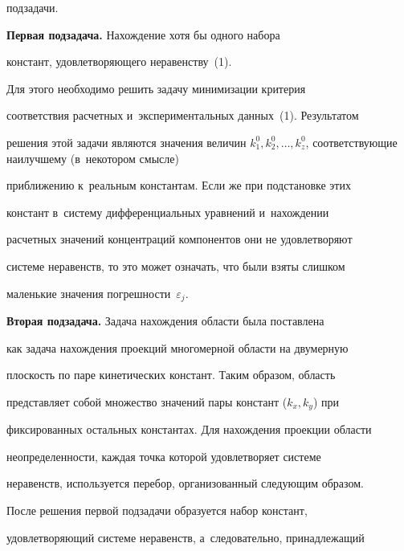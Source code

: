 под\-за\-дачи.

{



}



\smallskip

  

  \textbf{Первая подзадача.} Нахождение хотя бы одного набора 

констант, удовлетворяющего неравенству~(1). 

  

  Для этого необходимо решить задачу минимизации критерия 

соответствия расчетных и~экспериментальных данных~(1). Результатом 

решения этой задачи являются значения величин $k_1^0, k_2^0,\ldots , 

k_z^0$, соответствующие наилучшему (в~некотором смысле) 

приближению к~реальным константам. Если же при подстановке этих 

констант в~систему дифференциальных уравнений и~нахождении 

расчетных значений концентраций компонентов они не удовлетворяют 

системе неравенств, то это может означать, что были взяты слишком 

маленькие значения погрешности~$\varepsilon_j$.



\smallskip

  

  \textbf{Вторая подзадача.} Задача нахождения области была поставлена 

как задача нахождения проекций многомерной области на двумерную 

плоскость по паре кинетических констант. Таким образом, область 

представляет собой множество значений пары констант ($k_x, k_y$) при 

фиксированных остальных константах. Для нахождения проекции области 

неопределенности, каждая точка которой удовлетворяет системе 

неравенств, используется перебор, организованный следующим образом. 

После решения первой подзадачи образуется набор констант, 

удовле\-тво\-ря\-ющий системе неравенств, а~следовательно, принадлежащий 


